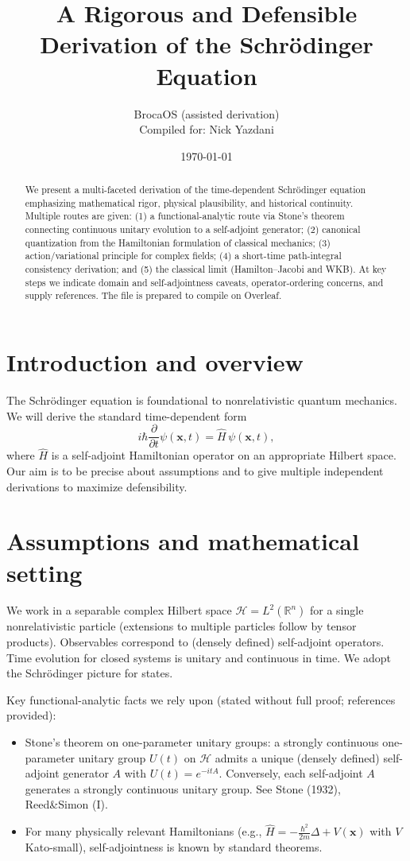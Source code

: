 \documentclass[11pt]{article}
\title{A Rigorous and Defensible Derivation of the Schr\"odinger Equation}
\author{BrocaOS (assisted derivation)\\Compiled for: Nick Yazdani}
\date{\today}
\begin{document}
\maketitle
\begin{abstract}
We present a multi-faceted derivation of the time-dependent Schr\"odinger equation emphasizing mathematical rigor, physical plausibility, and historical continuity.  Multiple routes are given: (1) a functional-analytic route via Stone's theorem connecting continuous unitary evolution to a self-adjoint generator; (2) canonical quantization from the Hamiltonian formulation of classical mechanics; (3) action/variational principle for complex fields; (4) a short-time path-integral consistency derivation; and (5) the classical limit (Hamilton--Jacobi and WKB).  At key steps we indicate domain and self-adjointness caveats, operator-ordering concerns, and supply references.  The file is prepared to compile on Overleaf.
\end{abstract}

\tableofcontents
\section{Introduction and overview}
The Schr\"odinger equation is foundational to nonrelativistic quantum mechanics.  We will derive the standard time-dependent form
\begin{equation}\label{eq:schrodinger}
 i\hbar\frac{\partial}{\partial t}\psi(\mathbf{x},t)=\hat H\,\psi(\mathbf{x},t),
\end{equation}
where $\hat H$ is a self-adjoint Hamiltonian operator on an appropriate Hilbert space.  Our aim is to be precise about assumptions and to give multiple independent derivations to maximize defensibility.

\section{Assumptions and mathematical setting}
We work in a separable complex Hilbert space $\mathcal{H}=L^2(\mathbb{R}^n)$ for a single nonrelativistic particle (extensions to multiple particles follow by tensor products).  Observables correspond to (densely defined) self-adjoint operators.  Time evolution for closed systems is unitary and continuous in time.  We adopt the Schr\"odinger picture for states.

Key functional-analytic facts we rely upon (stated without full proof; references provided):
\begin{itemize}
\item Stone's theorem on one-parameter unitary groups: a strongly continuous one-parameter unitary group $U(t)$ on $\mathcal{H}$ admits a unique (densely defined) self-adjoint generator $A$ with $U(t)=e^{-i t A}$.  Conversely, each self-adjoint $A$ generates a strongly continuous unitary group.  See Stone (1932), Reed\&Simon (I).
\item For many physically relevant Hamiltonians (e.g., $\hat H=-\tfrac{\hbar^2}{2m}\Delta+V(\mathbf{x})$ with $V$ Kato-small), self-adjointness is known by standard theorems.
\end{itemize}
\end{document}
